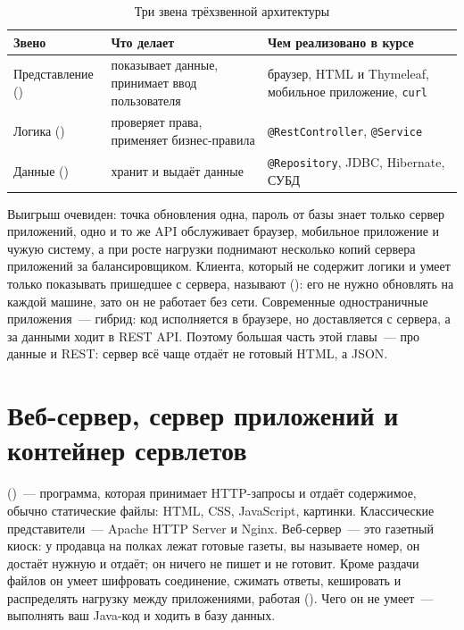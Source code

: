 \begin{table}[htbp]
\caption{Три звена трёхзвенной архитектуры}
\label{tab:08-1}
\centering
\begin{tabular}{L{3.4cm}L{5.8cm}L{5.6cm}}
\toprule
Звено & Что делает & Чем реализовано в курсе \\
\midrule
Представление () & показывает данные, принимает ввод
  пользователя & браузер, HTML и Thymeleaf, мобильное приложение,
  \texttt{curl} \\
Логика () & проверяет права, применяет бизнес-правила &
  \texttt{@RestController}, \texttt{@Service} \\
Данные () & хранит и выдаёт данные & \texttt{@Repository}, JDBC,
  Hibernate, СУБД \\
\bottomrule
\end{tabular}
\end{table}

Выигрыш очевиден: точка обновления одна, пароль от базы знает только сервер
приложений, одно и то же API обслуживает браузер, мобильное приложение и чужую
систему, а при росте нагрузки поднимают несколько копий сервера приложений за
балансировщиком. Клиента, который не содержит логики и умеет только показывать
пришедшее с сервера, называют  (): его не нужно
обновлять на каждой машине, зато он не работает без сети. Современные
одностраничные приложения~--- гибрид: код исполняется в браузере, но
доставляется с сервера, а за данными ходит в REST API. Поэтому большая часть
этой главы~--- про данные и REST: сервер всё чаще отдаёт не готовый HTML, а
JSON.

\section{Веб-сервер, сервер приложений и контейнер сервлетов}

 ()~--- программа, которая принимает
HTTP-запросы и отдаёт содержимое, обычно статические файлы: HTML, CSS,
JavaScript, картинки. Классические представители~--- Apache HTTP Server и
Nginx. Веб-сервер~--- это газетный киоск: у продавца на полках лежат готовые
газеты, вы называете номер, он достаёт нужную и отдаёт; он ничего не пишет и не
готовит. Кроме раздачи файлов он умеет шифровать соединение, сжимать ответы,
кешировать и распределять нагрузку между приложениями, работая  (). Чего он не умеет~--- выполнять ваш Java-код и
ходить в базу данных.

